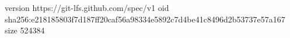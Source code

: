 version https://git-lfs.github.com/spec/v1
oid sha256:e218185803f7d187ff20caf56a98334e5892c7d4be41c8496d2b53737e57a167
size 524384
